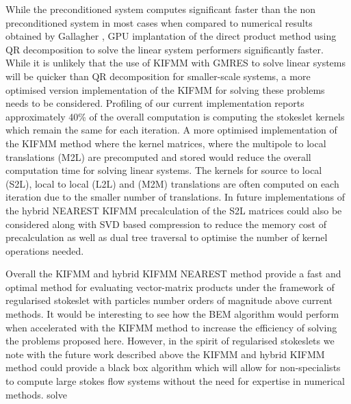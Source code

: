 While the preconditioned system computes significant faster than the non preconditioned system in most cases when compared to numerical results obtained by Gallagher \cite{Gallagher2020}, GPU implantation of the direct product method using QR decomposition to solve the linear system performers significantly faster. While it is unlikely that the use of KIFMM with GMRES to solve linear systems will be quicker than QR decomposition for smaller-scale systems, a more optimised version implementation of the KIFMM for solving these problems needs to be considered. Profiling of our current implementation reports approximately 40\% of the overall computation is computing the stokeslet kernels which remain the same for each iteration. A more optimised implementation of the KIFMM method where  the kernel matrices, where the multipole to local translations (M2L) are precomputed and stored would reduce the overall computation time for solving linear systems. The kernels for source to local (S2L), local to local (L2L) and (M2M) translations are often computed on each iteration due to the smaller number of translations. In future implementations of the hybrid NEAREST KIFMM precalculation of the S2L matrices could also be considered along with SVD based compression to reduce the memory cost of precalculation \cite{Drineas2006FAST,Cao2012ABEM} as well as dual tree traversal \cite{Yokota2013AnArchitectures:,Dehnen2002AAlgorithm,Carrier2006ASimulations,Wilson2021ATraversal} to optimise the number of kernel operations needed.

Overall the KIFMM and hybrid KIFMM NEAREST method provide a fast and optimal method for evaluating vector-matrix products under the framework of regularised stokeslet with particles number orders of magnitude above current methods. It would be interesting to see how the BEM algorithm would perform when accelerated with the KIFMM method \cite{Cao2012ABEM,Cao2015AAnalysis,Betcke2021Bempp-cl:Library.} to increase the efficiency of solving the problems proposed here. However, in the spirit of regularised stokeslets we note with the future work described above the KIFMM and hybrid KIFMM method could provide a black box algorithm which will allow for non-specialists to compute large stokes flow systems without the need for expertise in numerical methods. solve